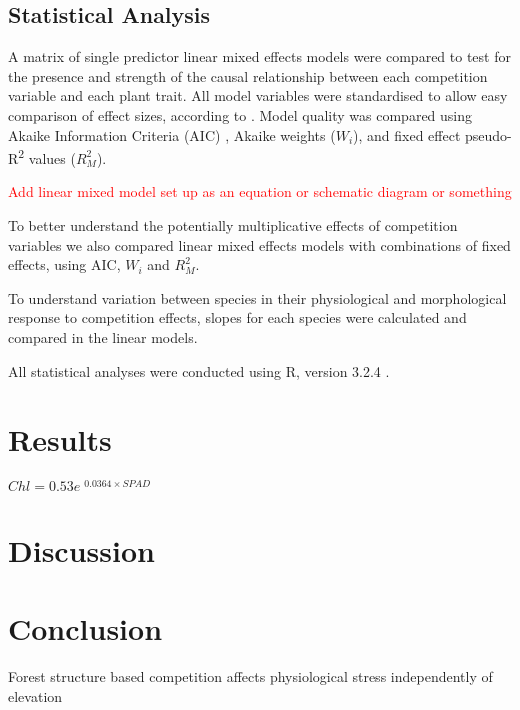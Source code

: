 \documentclass[a4paper,11pt]{article}
\newcommand{\todo}[1]{\textcolor{red}{#1}}   %
\begin{document}
\subsection*{Statistical Analysis}

A matrix of single predictor linear mixed effects models were compared to test for the presence and strength of the causal relationship between each competition variable and each plant trait. All model variables were standardised to allow easy comparison of effect sizes, according to \citep{Gelman2008, Grueber2011, Gelman2014}. Model quality was compared using Akaike Information Criteria (AIC) \citep{Akaike1998}, Akaike weights ($W_i$), and fixed effect pseudo-R\textsuperscript{2} values ($R_M^2$). 

\todo{Add linear mixed model set up as an equation or schematic diagram or something}

To better understand the potentially multiplicative effects of competition variables we also compared linear mixed effects models with combinations of fixed effects, using AIC, $W_i$ and $R_M^2$. 

To understand variation between species in their physiological and morphological response to competition effects, slopes for each species were calculated and compared in the linear models. 


All statistical analyses were conducted using R, version 3.2.4 \citep{R2016}.

\section*{Results}
   $Chl = 0.53e^{\begin{matrix} 0.0364 \times SPAD \end{matrix}}$

\section*{Discussion}

\section*{Conclusion}


Forest structure based competition affects physiological stress independently of elevation

\end{document}
